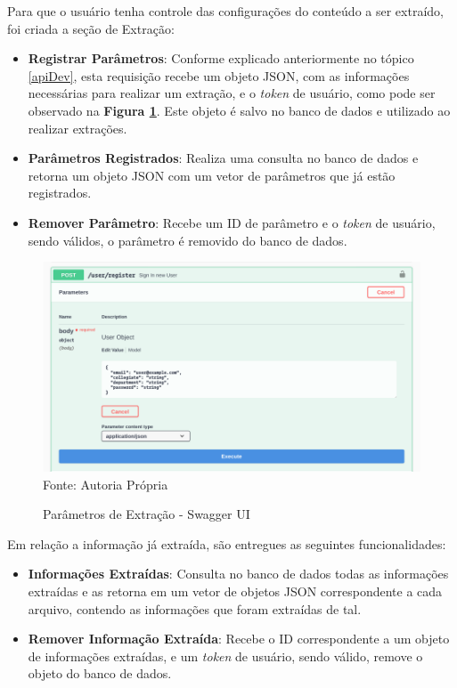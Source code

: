 Para que o usuário tenha controle das configurações do conteúdo a ser extraído, foi criada a seção de Extração:

\begin{itemize}
    \item \textbf{Registrar Parâmetros}: Conforme explicado anteriormente no tópico \ref{apiDev}, esta requisição recebe um objeto JSON, com as informações necessárias para realizar um extração, e o \textit{token} de usuário, como pode ser observado na \textbf{Figura \ref{swaggerExtractParam}}. Este objeto é salvo no banco de dados e utilizado ao realizar extrações.
    
    \item \textbf{Parâmetros Registrados}: Realiza uma consulta no banco de dados e retorna um objeto JSON com um vetor de parâmetros que já estão registrados.
    
    \item \textbf{Remover Parâmetro}: Recebe um ID de parâmetro e o \textit{token} de usuário, sendo válidos, o parâmetro é removido do banco de dados.
\end{itemize}

\begin{figure}[H]
\centering
\captionsetup{justification   = raggedright,
              singlelinecheck = false}
\caption{Parâmetros de Extração - Swagger UI}\label{swaggerExtractParam}
\includegraphics[width=1\textwidth]{figs/SwaggerUIExample.png}
\footnotesize Fonte: Autoria Própria
\end{figure}

Em relação a informação já extraída, são entregues as seguintes funcionalidades:

\begin{itemize}
    \item \textbf{Informações Extraídas}: Consulta no banco de dados todas as informações extraídas e as retorna em um vetor de objetos JSON correspondente a cada arquivo, contendo as informações que foram extraídas de tal.
    
    \item \textbf{Remover Informação Extraída}: Recebe o ID correspondente a um objeto de informações extraídas, e um \textit{token} de usuário, sendo válido, remove o objeto do banco de dados.
\end{itemize}

